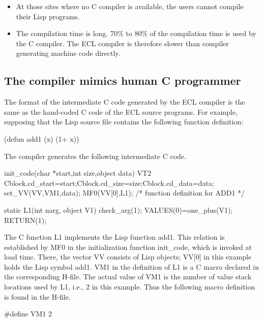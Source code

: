 \begin{itemize}
\item  At those sites where no C compiler is available,
the users cannot compile their Lisp programs.

\item The compilation time is long.  70\% to 80\% of the
compilation time is used by the C compiler.  The ECL compiler is
therefore slower than compiler generating machine code directly.
\end{itemize}

\subsection{The compiler mimics human C programmer}
 
The format of the intermediate C code generated by the ECL compiler is the
same as the hand-coded C code of the ECL source programs.  For example,
supposing that the Lisp source file contains the
following function definition:

\begin{example} 
            (defun add1 (x) (1+ x))
\end{example}

The compiler generates the following intermediate C code.

\begin{example}
     init_code(char *start,int size,object data)
     {      VT2
            Cblock.cd_start=start;Cblock.cd_size=size;Cblock.cd_data=data;
            set_VV(VV,VM1,data);
            MF0(VV[0],L1);
     }
     /*     function definition for ADD1     */
        
     static L1(int narg, object V1)
     {      
            check_arg(1);
            VALUES(0)=one_plus(V1);
            RETURN(1);
     }
\end{example}

The C function {\code L1} implements the Lisp function {\code
add1}.  This relation is established by {\code MF0} in the
initialization function {\code init\_code}, which is invoked at load
time.  There, the vector {\code VV} consists of Lisp objects; {\code
VV[0]} in this example holds the Lisp symbol {\code add1}.  {\code VM1} in
the definition of {\code L1} is a C macro declared in the corresponding
H-file.  The actual value of {\code VM1} is the number of value stack
locations used by {\code L1}, i.e., 2 in this example.  Thus the
following macro definition is found in the H-file.

\begin{example}
         #define VM1 2
\end{example}

